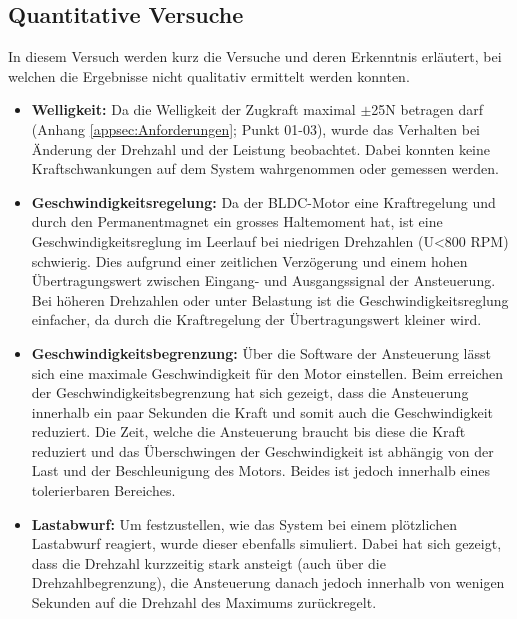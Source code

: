 \subsection{Quantitative Versuche}\label{subsec:Quantitative}
In diesem Versuch werden kurz die Versuche und deren Erkenntnis erläutert, bei welchen die Ergebnisse nicht qualitativ ermittelt werden konnten.
\begin{itemize}
	\item \textbf{Welligkeit:} Da die Welligkeit der Zugkraft maximal $\pm$25N betragen darf (Anhang \ref{appsec:Anforderungen}; Punkt 01-03), wurde das Verhalten bei Änderung der Drehzahl und der Leistung beobachtet. Dabei konnten keine Kraftschwankungen auf dem System wahrgenommen oder gemessen werden.
	\item \textbf{Geschwindigkeitsregelung:} Da der BLDC-Motor eine Kraftregelung und durch den Permanentmagnet ein grosses Haltemoment hat, ist eine Geschwindigkeitsreglung im Leerlauf bei niedrigen Drehzahlen (U<800 RPM) schwierig. Dies aufgrund einer zeitlichen Verzögerung und einem hohen Übertragungswert zwischen Eingang- und Ausgangssignal der Ansteuerung. Bei höheren Drehzahlen oder unter Belastung ist die Geschwindigkeitsreglung einfacher, da durch die Kraftregelung der Übertragungswert kleiner wird.
	\item \textbf{Geschwindigkeitsbegrenzung: } Über die Software der Ansteuerung lässt sich eine maximale Geschwindigkeit für den Motor einstellen. Beim erreichen der Geschwindigkeitsbegrenzung hat sich gezeigt, dass die Ansteuerung innerhalb ein paar Sekunden die Kraft und somit auch die Geschwindigkeit reduziert. Die Zeit, welche die Ansteuerung braucht bis diese die Kraft reduziert und das Überschwingen der Geschwindigkeit ist abhängig von der Last und der Beschleunigung des Motors. Beides ist jedoch innerhalb eines tolerierbaren Bereiches.
	\item \textbf{Lastabwurf:} Um festzustellen, wie das System bei einem plötzlichen Lastabwurf reagiert, wurde dieser ebenfalls simuliert. Dabei hat sich gezeigt, dass die Drehzahl kurzzeitig stark ansteigt (auch über die Drehzahlbegrenzung), die Ansteuerung danach jedoch innerhalb von wenigen Sekunden auf die Drehzahl des Maximums zurückregelt.
\end{itemize}
